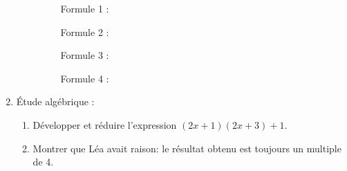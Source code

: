 \begin{enumerate}
\begin{enumerate}
\setlength\parindent{12mm}
\begin{description}
\item[ ] Formule 1 :  
\item[ ] Formule 2 :   
\item[ ] Formule 3 :   
\item[ ] Formule 4 :  
\end{description}
\setlength\parindent{0mm}

	\end{enumerate} 
\item Étude algébrique : 
	\begin{enumerate}
		\item Développer et réduire l'expression $(2x + 1)(2x + 3) + 1$. 
		\item Montrer que Léa avait raison: le résultat obtenu est toujours un multiple de 4.
	\end{enumerate} 
\end{enumerate} 

\vspace{0,5cm}

